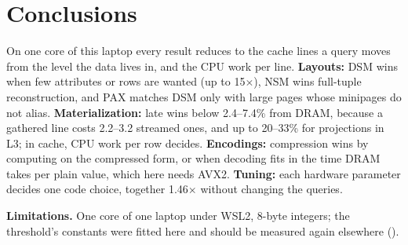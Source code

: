 \section{Conclusions}
On one core of this laptop every result reduces to the cache lines a query moves from the level
the data lives in, and the CPU work per line. \textbf{Layouts:} DSM wins when few attributes or
rows are wanted (up to 15$\times$), NSM wins full-tuple reconstruction, and PAX matches DSM only
with large pages whose minipages do not alias. \textbf{Materialization:} late wins below
2.4--7.4\% from DRAM, because a gathered line costs 2.2--3.2 streamed ones, and up to 20--33\%
for projections in L3; in cache, CPU work per row decides. \textbf{Encodings:} compression wins
by computing on the compressed form, or when decoding fits in the time DRAM takes per plain
value, which here needs AVX2. \textbf{Tuning:} each hardware parameter decides one code choice,
together 1.46$\times$ without changing the queries.

\textbf{Limitations.} One core of one laptop under WSL2, 8-byte integers; the threshold's
constants were fitted here and should be measured again elsewhere ().

